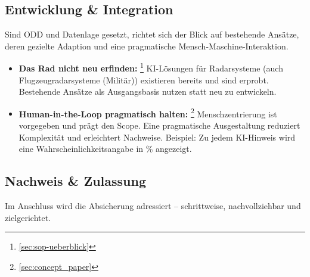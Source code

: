 \subsection*{Entwicklung \& Integration}
Sind ODD und Datenlage gesetzt, richtet sich der Blick auf bestehende Ansätze, 
deren gezielte Adaption und eine pragmatische Mensch-Maschine-Interaktion.

\medskip
\begin{itemize}

  \item \textbf{Das Rad nicht neu erfinden:} \footnote{\ref{sec:sop-ueberblick} }
        KI-Lösungen für Radarsysteme (auch Flugzeugradarsysteme (Militär)) existieren bereits und sind erprobt. 
        Bestehende Ansätze als Ausgangsbasis nutzen statt neu zu entwickeln.

  \item \textbf{Human-in-the-Loop pragmatisch halten:} \footnote{\ref{sec:concept_paper} }
        Menschzentrierung ist vorgegeben und prägt den Scope. Eine pragmatische Ausgestaltung reduziert 
        Komplexität und erleichtert Nachweise. Beispiel: Zu jedem KI-Hinweis wird eine Wahrscheinlichkeitsangabe in \% angezeigt.

\end{itemize}


\subsection*{Nachweis \& Zulassung}
Im Anschluss wird die Absicherung adressiert – schrittweise, nachvollziehbar und zielgerichtet.

